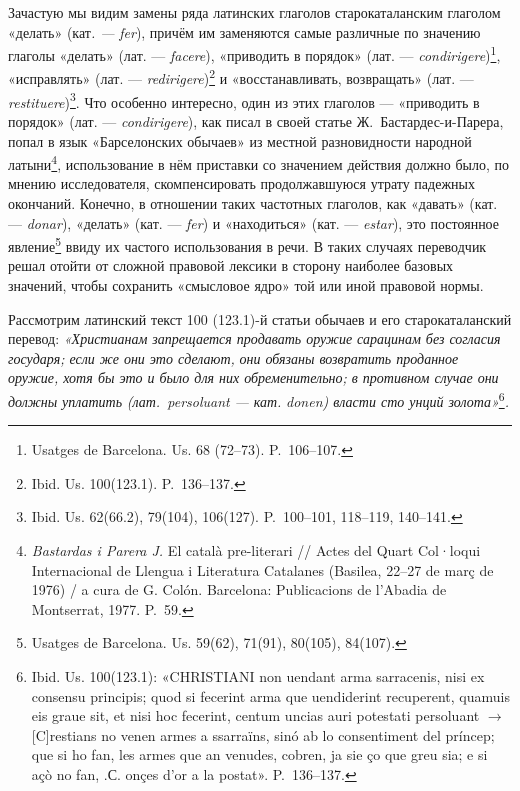 Зачастую мы видим замены ряда латинских глаголов старокаталанским глаголом «делать» (кат\emph{. --- }\emph{fer}), причём им заменяются самые различные по значению глаголы «делать» (лат. --- \emph{facere}), «приводить в порядок» (лат. --- \emph{condirigere})\footnote{Usatges de Barcelona. Us. 68 (72--73). P.~106--107.}, «исправлять» (лат. --- \emph{redirigere})\footnote{Ibid. Us. 100(123.1). P.~136--137.} и «восстанавливать, возвращать» (лат. --- \emph{restituere})\footnote{Ibid. Us. 62(66.2), 79(104), 106(127). P.~100--101, 118--119, 140--141.}. Что особенно интересно, один из этих глаголов --- «приводить в порядок» (лат. --- \emph{condirigere}), как писал в своей статье Ж.~Бастардес-и-Парера, попал в язык «Барселонских обычаев» из местной разновидности народной латыни\footnote{\emph{Bastardas i Parera J.} El català pre-literari // Actes del Quart Col·loqui Internacional de Llengua i Literatura Catalanes (Basilea, 22--27 de març de 1976) / a cura de G. Colón. Barcelona: Publicacions de l’Abadia de Montserrat, 1977. P.~59.}, использование в нём приставки со значением действия должно было, по мнению исследователя, скомпенсировать продолжавшуюся утрату падежных окончаний. Конечно, в отношении таких частотных глаголов, как «давать» (кат. --- \emph{donar}), «делать» (кат. --- \emph{fer}) и «находиться» (кат. --- \emph{estar}), это постоянное явление\footnote{Usatges de Barcelona. Us. 59(62), 71(91), 80(105), 84(107).} ввиду их частого использования в речи. В таких случаях переводчик решал отойти от сложной правовой лексики в сторону наиболее базовых значений, чтобы сохранить «смысловое ядро» той или иной правовой нормы.

Рассмотрим латинский текст 100 (123.1)-й статьи обычаев и его старокаталанский перевод: \emph{«Христианам запрещается продавать оружие сарацинам без согласия государя; если же они это сделают, }\emph{они обязаны возвратить проданное оружие, хотя бы это и было для них обременительно; в противном случае они должны }\emph{уплатить}\emph{ (лат.}\emph{~}\emph{persoluant}\emph{ --- кат. }\emph{donen}\emph{) власти сто унций золота»}\footnote{Ibid. Us. 100(123.1): «CHRISTIANI non uendant arma sarracenis, nisi ex consensu principis; quod si fecerint arma que uendiderint recuperent, quamuis eis graue sit, et nisi hoc fecerint, centum uncias auri potestati persoluant  $\rightarrow$ [C]restians no venen armes a ssarraïns, sinó ab lo consentiment del príncep; que si ho fan, les armes que an venudes, cobren, ja sie ço que greu sia; e si açò no fan, .С. onçes d’or a la postat». P.~136--137.}\emph{.}

